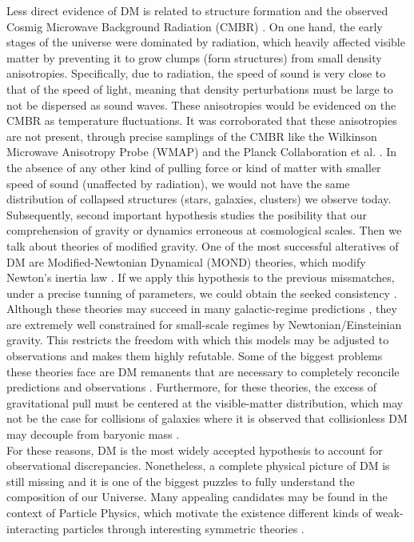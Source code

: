 Less direct evidence of DM is related to structure formation and the observed Cosmig Microwave Background Radiation (CMBR) \cite{Blumenthal_et_al._1984}. On one hand, the early stages of the universe were dominated by radiation, which heavily affected visible matter by preventing it to grow clumps (form structures) from small density anisotropies. Specifically, due to radiation, the speed of sound is very close to that of the speed of light, meaning that density perturbations must be large to not be dispersed as sound waves. These anisotropies would be evidenced on the CMBR as temperature fluctuations. It was corroborated that these anisotropies are not present, through precise samplings of the CMBR like the Wilkinson Microwave Anisotropy Probe (WMAP) \cite{WMAP_2003,WMAP_2013} and the Planck Collaboration et al. \cite{Planck_Collaboration_2014,Planck_Collaboration_2016}. In the absence of any other kind of pulling force or kind of matter with smaller speed of sound (unaffected by radiation), we would not have the same distribution of collapsed structures (stars, galaxies, clusters) we observe today. \\


Subsequently, second important hypothesis studies the posibility that our comprehension of gravity or dynamics erroneous at cosmological scales. Then we talk about theories of modified gravity. One of the most successful alteratives of DM are Modified-Newtonian Dynamical (MOND) theories, which modify Newton's inertia law \cite{Milgrom_1983}. If we apply this hypothesis to the previous missmatches, under a precise tunning of parameters, we could obtain the seeked consistency \cite{Sanders_and_McGaugh_2002}. Although these theories may succeed in many galactic-regime predictions \cite{Begeman_et_al._1991,McGaugh_and_de_Blok_1998,McGaugh_2012}, they are extremely well constrained for small-scale regimes by Newtonian/Einsteinian gravity. This restricts the freedom with which this models may be adjusted to observations and makes them highly refutable. Some of the biggest problems these theories face are DM remanents that are necessary to completely reconcile predictions and observations \cite{Lokas_2002,McGaugh_2015}. Furthermore, for these theories, the excess of gravitational pull must be centered at the visible-matter distribution, which may not be the case for collisions of galaxies where it is observed that collisionless DM may decouple from baryonic mass \cite{Clowe_et_al._2006}.\\

For these reasons, DM is the most widely accepted hypothesis to account for observational discrepancies. Nonetheless, a complete physical picture of DM is still missing and it is one of the biggest puzzles to fully understand the composition of our Universe. Many appealing candidates may be found in the context of Particle Physics, which motivate the existence different kinds of weak-interacting particles through interesting symmetric theories \cite{Kim_1987,Bertone_et_al._2005}.\\

